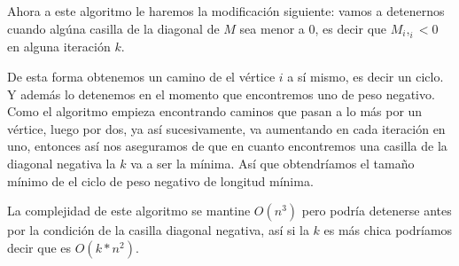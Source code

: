 \documentclass[11pt,letterpaper]{article}
\begin{document}
\begin{enumerate}[leftmargin=*]
    Ahora a este algoritmo le haremos la modificación siguiente: vamos a detenernos cuando algúna casilla de la diagonal de $M$ sea menor a $0$, es decir que $M_i,_i < 0$ en alguna iteración $k$.

    De esta forma obtenemos un camino de el vértice $i$ a sí mismo, es decir un ciclo.
    Y además lo detenemos en el momento que encontremos uno de peso negativo.
    Como el algoritmo empieza encontrando caminos que pasan a lo más por un vértice, luego por dos, ya así sucesivamente, va aumentando en cada iteración en uno, entonces así nos aseguramos de que en cuanto encontremos una casilla de la diagonal negativa la $k$ va a ser la mínima.
    Así que obtendríamos el tamaño mínimo de el ciclo de peso negativo de longitud mínima.

    La complejidad de este algoritmo se mantine $O(n^3)$ pero podría detenerse antes por la condición de la casilla diagonal negativa, así si la $k$ es más chica podríamos decir que es $O(k*n^2)$.
  \end{enumerate}
\end{document}
